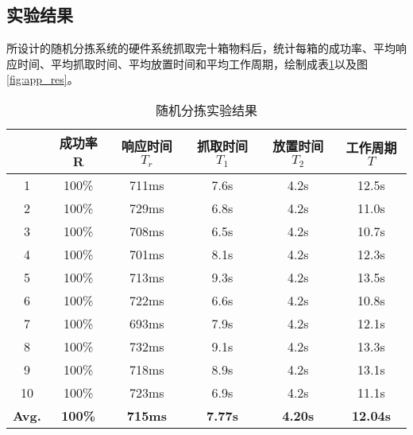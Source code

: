 \subsection{实验结果}
所设计的随机分拣系统的硬件系统抓取完十箱物料后，统计每箱的成功率、平均响应时间、平均抓取时间、平均放置时间和平均工作周期，绘制成表\ref{tab:app_res}以及图\ref{fig:app_res}。
\begin{table}[ht]
  \centering
  \begin{tabular}{cccccc}
    \toprule
    &成功率R&响应时间$T_r$&抓取时间$T_1$&放置时间$T_2$&工作周期$T$ \\
    \midrule
    1&100\%&711ms&7.6s&4.2s&12.5s \\
    2&100\%&729ms&6.8s&4.2s&11.0s \\
    3&100\%&708ms&6.5s&4.2s&10.7s \\
    4&100\%&701ms&8.1s&4.2s&12.3s \\
    5&100\%&713ms&9.3s&4.2s&13.5s \\
    6&100\%&722ms&6.6s&4.2s&10.8s \\
    7&100\%&693ms&7.9s&4.2s&12.1s \\
    8&100\%&732ms&9.1s&4.2s&13.3s \\
    9&100\%&718ms&8.9s&4.2s&13.1s \\
   10&100\%&723ms&6.9s&4.2s&11.1s \\
    \bf{Avg.}&\bf{100\%}&\bf{715ms}&\bf{7.77s}&\bf{4.20s}&\bf{12.04s} \\
    \bottomrule
  \end{tabular}
  \caption{随机分拣实验结果}
  \label{tab:app_res}
\end{table}
